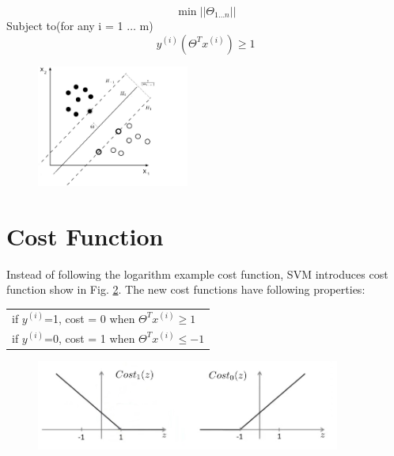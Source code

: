 \documentclass{article}
\begin{document}
\begin{equation}
\min ||\Theta_{1 \ldots n}||
\end{equation}
Subject to(for any i = 1 $\ldots$ m)\\
\begin{equation}\label{}
y^{(i)}(\Theta^{T}x^{(i)}) \ge 1
\end{equation}
\begin{figure}[ht]
  \centering
  \includegraphics[width=5cm]{Figure2.jpg}\\
  \caption{}\label{hyper-plane-example2}
\end{figure}

\newpage
\section{Cost Function}
Instead of following the logarithm example cost function, SVM introduces cost function show in Fig. \ref{example_cost_funtion_visulization}. The new cost functions have following properties:
\begin{table}[h]
\begin{center}
\begin{tabular}{l}
if $y^{(i)}$=1, cost = 0 when $\Theta^{T}x^{(i)} \ge 1$\\
if $y^{(i)}$=0, cost = 1 when $\Theta^{T}x^{(i)} \le -1$\\
\end{tabular}
\end{center}
\end{table}
\begin{figure}[ht]
  \centering
  \includegraphics[width=10cm]{Figure3.jpg}\\
  \caption{}\label{example_cost_funtion_visulization}
\end{figure}
\end{document}
